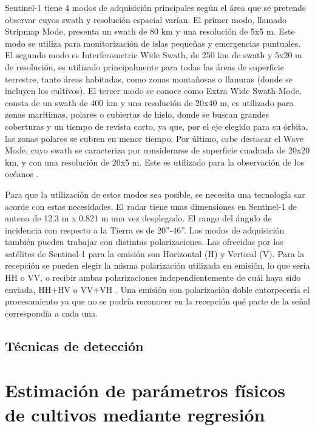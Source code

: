 \par Sentinel-1 tiene 4 modos de adquisición principales según el área que se pretende observar cuyos swath y resolución espacial varían. El primer modo, llamado Stripmap Mode, presenta un swath de 80 km y una resolución de 5x5 m. Este modo se utiliza para monitorización de islas pequeñas y emergencias puntuales. El segundo modo es Interferometric Wide Swath, de 250 km de swath y 5x20 m de resolución, es utilizado principalmente para todas las áreas de superficie terrestre, tanto áreas habitadas, como zonas montañosas o llanuras (donde se incluyen los cultivos). El tercer modo se conoce como Extra Wide Swath Mode, consta de un swath de 400 km y una resolución de 20x40 m, es utilizado para zonas marítimas, polares o cubiertas de hielo, donde se buscan grandes coberturas y un tiempo de revista corto, ya que, por el eje elegido para su órbita, las zonas polares se cubren en menor tiempo. Por último, cabe destacar el Wave Mode, cuyo swath se caracteriza por considerarse de superficie cuadrada de 20x20 km, y con una resolución de 20x5 m. Este es utilizado para la observación de los océanos \cite{EOSs1}. 
\\
\par Para que la utilización de estos modos sea posible, se necesita una tecnología \gls{sar} acorde con estas necesidades. El radar tiene unas dimensiones en Sentinel-1 de antena de 12.3 m x 0.821 m una vez desplegado. El rango del ángulo de incidencia con respecto a la Tierra es de 20”-46”. Los modos de adquisición también pueden trabajar con distintas polarizaciones. Las ofrecidas por los satélites de Sentinel-1 para la emisión son Horizontal (H) y Vertical (V). Para la recepción se pueden elegir la misma polarización utilizada en emisión, lo que sería HH o VV, o recibir ambas polarizaciones independientemente de cuál haya sido enviada, HH+HV o VV+VH \cite{EOSs1}. Una emisión con polarización doble entorpecería el procesamiento ya que no se podría reconocer en la recepción qué parte de la señal correspondía a cada una. 


\subsection{Técnicas de detección}
\section{Estimación de parámetros físicos de cultivos mediante regresión}
 